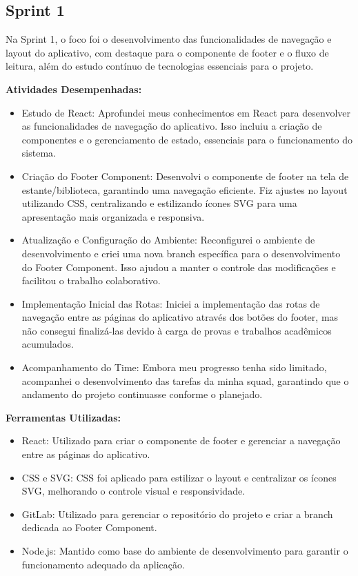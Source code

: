 \subsection{Sprint 1}

Na Sprint 1, o foco foi o desenvolvimento das funcionalidades de
navegação e layout do aplicativo, com destaque para o componente de
footer e o fluxo de leitura, além do estudo contínuo de tecnologias
essenciais para o projeto.

\textbf{Atividades Desempenhadas:}

\begin{itemize}
\item
  Estudo de React: Aprofundei meus conhecimentos em React para
  desenvolver as funcionalidades de navegação do aplicativo. Isso
  incluiu a criação de componentes e o gerenciamento de estado,
  essenciais para o funcionamento do sistema.
\item
  Criação do Footer Component: Desenvolvi o componente de footer na tela
  de estante/biblioteca, garantindo uma navegação eficiente. Fiz ajustes
  no layout utilizando CSS, centralizando e estilizando ícones SVG para
  uma apresentação mais organizada e responsiva.
\item
  Atualização e Configuração do Ambiente: Reconfigurei o ambiente de
  desenvolvimento e criei uma nova branch específica para o
  desenvolvimento do Footer Component. Isso ajudou a manter o controle
  das modificações e facilitou o trabalho colaborativo.
\item
  Implementação Inicial das Rotas: Iniciei a implementação das rotas de
  navegação entre as páginas do aplicativo através dos botões do footer,
  mas não consegui finalizá-las devido à carga de provas e trabalhos
  acadêmicos acumulados.
\item
  Acompanhamento do Time: Embora meu progresso tenha sido limitado,
  acompanhei o desenvolvimento das tarefas da minha squad, garantindo
  que o andamento do projeto continuasse conforme o planejado.
\end{itemize}

\textbf{Ferramentas Utilizadas:}

\begin{itemize}
\item
  React: Utilizado para criar o componente de footer e gerenciar a
  navegação entre as páginas do aplicativo.
\item
  CSS e SVG: CSS foi aplicado para estilizar o layout e centralizar os
  ícones SVG, melhorando o controle visual e responsividade.
\item
  GitLab: Utilizado para gerenciar o repositório do projeto e criar a
  branch dedicada ao Footer Component.
\item
  Node.js: Mantido como base do ambiente de desenvolvimento para
  garantir o funcionamento adequado da aplicação.
\end{itemize}

